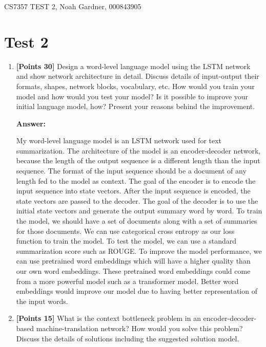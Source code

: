 \documentclass[12pt]{article}
\begin{document}
CS7357 TEST 2, Noah Gardner, 000843905\newline

\section{Test 2}
\begin{enumerate}
    \item \textbf{[Points 30]} Design a word-level language model using the LSTM
          network and show network architecture in detail. Discuss details of
          input-output their formats, shapes, network blocks, vocabulary, etc.
          How would you train your model and how would you test your model? Is
          it possible to improve your initial language model, how? Present your
          reasons behind the improvement.

          \textbf{Answer:}

          My word-level language model is an LSTM network used for text
          summarization. The architecture of the model is an encoder-decoder
          network, because the length of the output sequence is a different
          length than the input sequence. The format of the input sequence
          should be a document of any length fed to the model as context. The
          goal of the encoder is to encode the input sequence into state
          vectors. After the input sequence is encoded, the state vectors are
          passed to the decoder. The goal of the decoder is to use the initial
          state vectors and generate the output summary word by word. To train
          the model, we should have a set of documents along with a set of
          summaries for those documents. We can use categorical cross entropy as
          our loss function to train the model. To test the model, we can use
          a standard summarization score such as ROUGE. To improve the model
          performance, we can use pretrained word embeddings which will have a
          higher quality than our own word embeddings. These pretrained word
          embeddings could come from a more powerful model such as a transformer
          model. Better word embeddings would improve our model due to having
          better representation of the input words.

    \item \textbf{[Points 15]} What is the context bottleneck problem in an
          encoder-decoder-based machine-translation network? How would you solve
          this problem? Discuss the details of solutions including the suggested
          solution model.


\end{enumerate}
\end{document}
